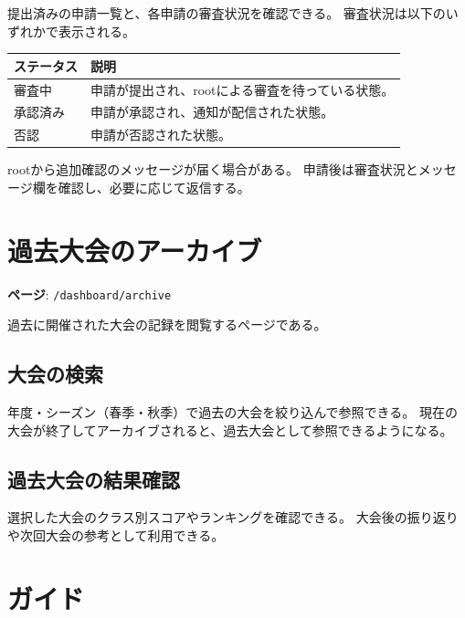 \documentclass[12pt]{ltjsarticle}
\newcommand{\code}[1]{\colorbox{gray!20}{\texttt{#1}}}
\begin{document}
提出済みの申請一覧と、各申請の審査状況を確認できる。
審査状況は以下のいずれかで表示される。

\begin{center}
\begin{tabular}{lp{9cm}}
\toprule
\textbf{ステータス} & \textbf{説明} \\
\midrule
審査中 & 申請が提出され、rootによる審査を待っている状態。 \\
承認済み & 申請が承認され、通知が配信された状態。 \\
否認 & 申請が否認された状態。 \\
\bottomrule
\end{tabular}
\end{center}

rootから追加確認のメッセージが届く場合がある。
申請後は審査状況とメッセージ欄を確認し、必要に応じて返信する。

\newpage

\section{過去大会のアーカイブ}

\textbf{ページ}: \code{/dashboard/archive}

過去に開催された大会の記録を閲覧するページである。

\subsection{大会の検索}

年度・シーズン（春季・秋季）で過去の大会を絞り込んで参照できる。
現在の大会が終了してアーカイブされると、過去大会として参照できるようになる。

\subsection{過去大会の結果確認}

選択した大会のクラス別スコアやランキングを確認できる。
大会後の振り返りや次回大会の参考として利用できる。

\newpage

\section{ガイド}\label{sec:guide}
\end{document}
